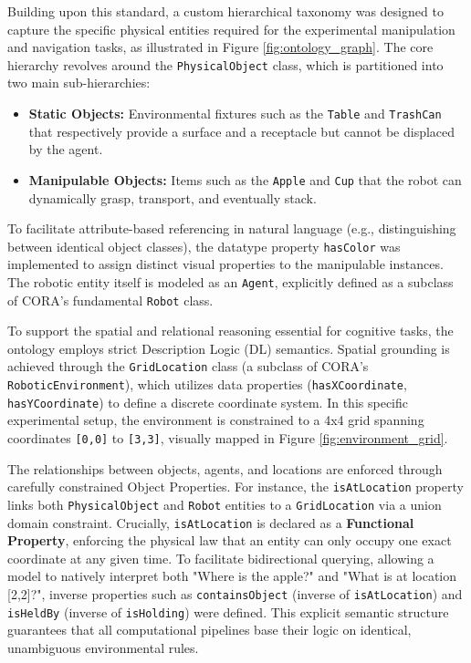 \documentclass[a4paper]{article}
\begin{document}
Building upon this standard, a custom hierarchical taxonomy was designed to capture the specific physical entities required for the experimental manipulation and navigation tasks, as illustrated in Figure \ref{fig:ontology_graph}. The core hierarchy revolves around the \texttt{PhysicalObject} class, which is partitioned into two main sub-hierarchies:
\begin{itemize}
    \item \textbf{Static Objects:} Environmental fixtures such as the \texttt{Table} and \texttt{TrashCan} that respectively provide a surface and a receptacle but cannot be displaced by the agent.
    \item \textbf{Manipulable Objects:} Items such as the \texttt{Apple} and \texttt{Cup} that the robot can dynamically grasp, transport, and eventually stack.
\end{itemize}
To facilitate attribute-based referencing in natural language (e.g., distinguishing between identical object classes), the datatype property \texttt{hasColor} was implemented to assign distinct visual properties to the manipulable instances. The robotic entity itself is modeled as an \texttt{Agent}, explicitly defined as a subclass of CORA's fundamental \texttt{Robot} class.

To support the spatial and relational reasoning essential for cognitive tasks, the ontology employs strict Description Logic (DL) semantics. Spatial grounding is achieved through the \texttt{GridLocation} class (a subclass of CORA's \texttt{RoboticEnvironment}), which utilizes data properties (\texttt{hasXCoordinate}, \texttt{hasYCoordinate}) to define a discrete coordinate system. In this specific experimental setup, the environment is constrained to a 4x4 grid spanning coordinates \texttt{[0,0]} to \texttt{[3,3]}, visually mapped in Figure \ref{fig:environment_grid}.

The relationships between objects, agents, and locations are enforced through carefully constrained Object Properties. For instance, the \texttt{isAtLocation} property links both \texttt{PhysicalObject} and \texttt{Robot} entities to a \texttt{GridLocation} via a union domain constraint. Crucially, \texttt{isAtLocation} is declared as a \textbf{Functional Property}, enforcing the physical law that an entity can only occupy one exact coordinate at any given time. To facilitate bidirectional querying, allowing a model to natively interpret both "Where is the apple?" and "What is at location [2,2]?", inverse properties such as \texttt{containsObject} (inverse of \texttt{isAtLocation}) and \texttt{isHeldBy} (inverse of \texttt{isHolding}) were defined. This explicit semantic structure guarantees that all computational pipelines base their logic on identical, unambiguous environmental rules.
\end{document}

